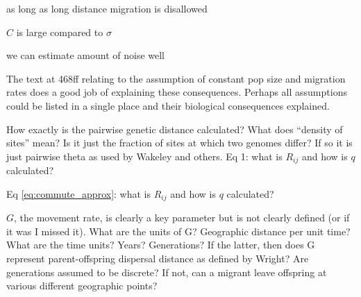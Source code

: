 \begin{point}{\revref}
     as long as long distance migration is disallowed
\end{point}


\begin{point}{\revref}
     $C$ is large compared to $\sigma$
\end{point}


\begin{point}{\revref}
     we can estimate amount of noise well
\end{point}


\begin{point}{}
    The text at 468ff relating to the assumption of constant pop size and migration
    rates does a good job of explaining these consequences.  Perhaps all
    assumptions could be listed in a single place and their biological
    consequences explained.
\end{point}


\begin{point}{\revref}
    How exactly is the pairwise genetic distance calculated?  What does ``density
    of sites'' mean?  Is it just the fraction of sites at which two genomes
    differ?  If so it is just pairwise theta as used by Wakeley and others.  
    Eq 1:  what is $R_{ij}$ and how is $q$ calculated?
\end{point}


\begin{point}{}
    Eq \eqref{eq:commute_approx}: what is $R_{ij}$ and how is $q$ calculated?
\end{point}


\begin{point}{}
    $G$, the movement rate, is clearly a key parameter but is not clearly defined (or
    if it was I missed it).  What are the units of G?  Geographic distance per
    unit time?  What are the time units?  Years?  Generations?  If the latter,
    then does G represent parent-offspring dispersal distance as defined by
    Wright?  Are generations assumed to be discrete?  If not, can a migrant
    leave offspring at various different geographic points?
\end{point}

